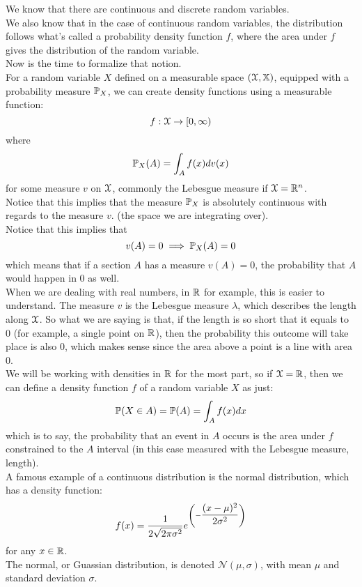 \documentclass[12pt]{article}
\begin{document}
    We know that there are continuous
    and discrete random variables. \\
    We also know that in the case of continuous
    random variables, the distribution follows
    what's called a probability density 
    function $f$,
    where the area under $f$ gives the
    distribution of the random variable. \\
    Now is the time to formalize that notion. \\

    For a random variable $X$
    defined on a measurable space $(\mathcal{X}, \mathbb{X})$,
    equipped with a probability measure $\mathbb{P}_X$,
    we can create density functions using
    a measurable function:
    \[ f:\mathcal{X} \to [0, \infty) \]
    where
    \[ \mathbb{P}_X(A) = \int_{A}f(x)dv(x) \]
    for some measure $v$ on $\mathcal{X}$,
    commonly the Lebesgue measure
    if $\mathcal{X} = \mathbb{R}^n$. \\
    
    Notice that this implies that the 
    measure $\mathbb{P}_X$ is absolutely
    continuous with regards to the measure $v$.
    (the space we are integrating over). \\
    Notice that this implies that
    \[ v(A) = 0 \implies \mathbb{P}_X(A) = 0 \]
    which means that if a section $A$
    has a measure $v(A) = 0$,
    the probability that $A$ would happen in $0$
    as well. \\
    When we are dealing with real numbers,
    in $\mathbb{R}$ for example,
    this is easier to understand.
    The measure $v$ is the Lebesgue
    measure $\lambda$,
    which describes the length along $\mathcal{X}$.
    So what we are saying is that,
    if the length is so short that it equals
    to 0 (for example, a single point on $\mathbb{R}$),
    then the probability this outcome will take
    place is also 0,
    which makes sense since the area above a point
    is a line with area 0. \\

    We will be working with densities in $\mathbb{R}$
    for the most part,
    so if $\mathcal{X} = \mathbb{R}$,
    then we can define a density function $f$
    of a random variable $X$ as just:
    \[ \mathbb{P}(X \in A) = \mathbb{P}(A) = 
    \int_Af(x)dx \]
    which is to say, the probability
    that an event in $A$ occurs is the area
    under $f$ constrained to the $A$ interval
    (in this case measured with the Lebesgue measure,
    length). \\

    A famous example of a continuous
    distribution is the normal distribution,
    which has a density function:
    \[ f(x) = \dfrac{1}{2\sqrt{2\pi \sigma^2}}
    e^{\left( -\dfrac{(x-\mu)^2}{2\sigma^2} \right)} \]
    for any $x \in \mathbb{R}$. \\
    The normal, or Guassian distribution,
    is denoted $\mathcal{N}(\mu, \sigma)$,
    with mean $\mu$ and standard
    deviation $\sigma$. \\
\end{document}
